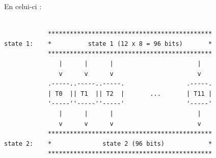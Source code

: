 \documentclass[a4paper,12pt]{article}
\begin{document}
En celui-ci :

\begin{Verbatim}[samepage=true]

            *********************************************
state 1:    *          state 1 (12 x 8 = 96 bits)       *
            *********************************************
               |      |      |                       |
               v      v      v                       v
            .-----..-----..-----.                 .-----.
            | T0  || T1  || T2  |       ...       | T11 |
            '-----''-----''-----'                 '-----'
               |      |      |                       |
               v      v      v                       v
            *********************************************
state 2:    *              state 2 (96 bits)            *
            *********************************************			
			
\end{Verbatim}
		
\end{document}
